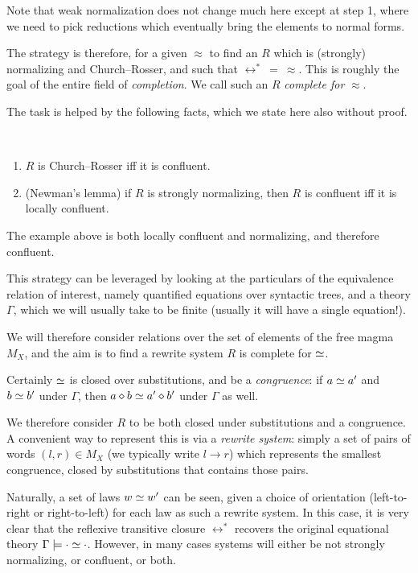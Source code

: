 Note that weak normalization does not change much here except at step 1, where we need to pick reductions which eventually bring the elements to normal forms.

The strategy is therefore, for a given $\approx$ to find an $R$ which is (strongly) normalizing and Church--Rosser, and such that $\leftrightarrow^*\ =\ \approx$. This is roughly the goal of the entire field of \emph{completion}. We call such an $R$ \emph{complete for} $\approx$.

The task is helped by the following facts, which we state here also without proof.

\begin{theorem}\
  \begin{enumerate}
    \item $R$ is Church--Rosser iff it is confluent.
    \item (Newman's lemma) if $R$ is strongly normalizing, then $R$ is confluent iff it is locally confluent.
  \end{enumerate}
\end{theorem}

The example above is both locally confluent and normalizing, and therefore confluent.

This strategy can be leveraged by looking at the particulars of the equivalence relation of interest, namely quantified equations over syntactic trees, and a theory $\Gamma$, which we will usually take to be finite (usually it will have a single equation!).

We will therefore consider relations over the set of elements of the free magma $M_{X}$, and the aim is to find a rewrite system $R$ is complete for $\simeq$.

Certainly $\simeq$ is closed over substitutions, and be a \emph{congruence}: if $a\simeq a'$ and $b\simeq b'$ under $\Gamma$, then $a\diamond b\simeq a'\diamond b'$ under $\Gamma$ as well.

We therefore consider $R$ to be both closed under substitutions and a congruence. A convenient way to represent this is via a \emph{rewrite system}: simply a set of pairs of words $(l, r) \in M_{X}$ (we typically write $l\rightarrow r$) which represents the smallest congruence, closed by substitutions that contains those pairs.

Naturally, a set of laws $w \simeq w'$ can be seen, given a choice of orientation (left-to-right or right-to-left) for each law as such a rewrite system. In this case, it is very clear that the reflexive transitive closure $\leftrightarrow^*$ recovers the original equational theory $\Gamma\models \cdot\simeq\cdot$. However, in many cases systems will either be not strongly normalizing, or confluent, or both.

